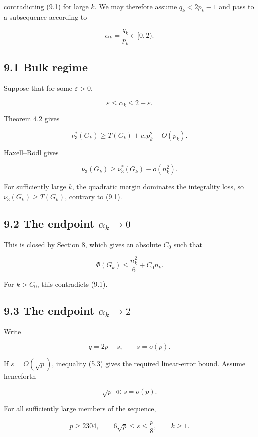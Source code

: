 \documentclass[
  american,
  11pt,
  a4paper,
]{article}
\begin{document}
contradicting (9.1) for large \(k\). We may therefore assume \(q_k<2p_k-1\) and pass to a subsequence according to

\[
\alpha_k=\frac{q_k}{p_k}\in[0,2).
\]

\subsection{9.1 Bulk regime}\label{bulk-regime}

Suppose that for some \(\varepsilon>0\),

\[
\varepsilon\le\alpha_k\le2-\varepsilon.
\]

Theorem 4.2 gives

\[
\nu_3^*(G_k)
\ge
T(G_k)+c_\varepsilon p_k^2-O(p_k).
\]

Haxell--Rödl gives

\[
\nu_3(G_k)
\ge
\nu_3^*(G_k)-o(n_k^2).
\]

For sufficiently large \(k\), the quadratic margin dominates the integrality loss, so \(\nu_3(G_k)\ge T(G_k)\), contrary to (9.1).

\subsection{\texorpdfstring{9.2 The endpoint \(\alpha_k\to0\)}{9.2 The endpoint \textbackslash alpha\_k\textbackslash to0}}\label{the-endpoint-alpha_kto0}

This is closed by Section 8, which gives an absolute \(C_0\) such that

\[
\Phi(G_k)
\le
\frac{n_k^2}{6}+C_0n_k.
\]

For \(k>C_0\), this contradicts (9.1).

\subsection{\texorpdfstring{9.3 The endpoint \(\alpha_k\to2\)}{9.3 The endpoint \textbackslash alpha\_k\textbackslash to2}}\label{the-endpoint-alpha_kto2}

Write

\[
q=2p-s,
\qquad
s=o(p).
\]

If \(s=O(\sqrt p)\), inequality (5.3) gives the required linear-error bound. Assume henceforth

\[
\sqrt p\ll s=o(p).
\tag{9.3}
\]

For all sufficiently large members of the sequence,

\[
p\ge2304,
\qquad
6\sqrt p\le s\le\frac p8,
\qquad
k\ge1.
\tag{9.4}
\]
\end{document}
